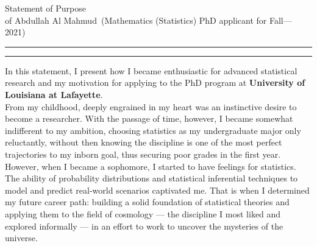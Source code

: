 \documentclass{article}
\newcommand{\soptitle}{Statement of Purpose}
\newcommand{\yourname}{Abdullah Al Mahmud}
\begin{document}
\begin{center}\LARGE\soptitle\\
\large of \yourname\ (Mathematics (Statistics) PhD applicant for Fall---2021)
\end{center}

\hrule
\vspace{1pt}
\hrule height 1pt

\bigskip

In this statement, I present how I became enthusiastic for advanced statistical research and my motivation for applying to the PhD program at \textbf{University of Louisiana at Lafayette}. \\

From my childhood, deeply engrained in my heart was an instinctive desire to become a researcher. With the passage of time, however, I became somewhat indifferent to my ambition, choosing statistics as my undergraduate major only reluctantly, without then knowing the discipline is one of the most perfect trajectories to my inborn goal, thus securing poor grades in the first year. However, when I became a sophomore, I started to have feelings for statistics. The ability of probability distributions and statistical inferential techniques to model and predict real-world scenarios captivated me. That is when I determined my future career path: building a solid foundation of statistical theories and applying them to the field of cosmology --- the discipline I most liked and explored informally --- in an effort to work to uncover the mysteries of the universe. \\
\end{document}
